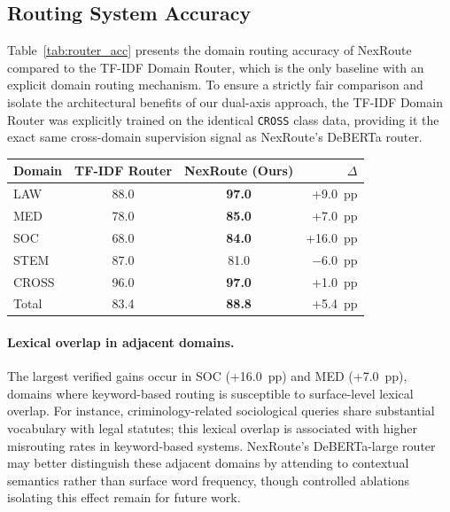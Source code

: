 \documentclass[a4paper,fleql,doubleblind]{cas-sc}
\begin{document}
\subsection{Routing System Accuracy}
\label{ssec:router}
Table~\ref{tab:router_acc} presents the domain routing accuracy of NexRoute
compared to the TF-IDF Domain Router, which is the only baseline with an explicit domain routing mechanism.
To ensure a strictly fair comparison and isolate the architectural
benefits of our dual-axis approach, the TF-IDF Domain Router was explicitly
trained on the identical \texttt{CROSS} class data, providing it the exact
same cross-domain supervision signal as NexRoute's DeBERTa router.

\vspace{6pt plus 4pt minus 3pt}
\begin{center}
\begingroup
{}
\label{tab:router_acc}
\begin{tabular}{lccr}
\toprule
\textbf{Domain} & \textbf{TF-IDF Router} & \textbf{NexRoute (Ours)} & \textbf{$\Delta$} \\
\midrule
LAW              & 88.0 & \textbf{97.0}  & +9.0~pp \\
MED              & 78.0 & \textbf{85.0}  & +7.0~pp \\
SOC              & 68.0 & \textbf{84.0}  & +16.0~pp \\
STEM             & 87.0 & 81.0           & $-$6.0~pp \\
\midrule
CROSS            & 96.0 & \textbf{97.0}  & +1.0~pp \\
\midrule
Total            & 83.4 & \textbf{88.8}  & +5.4~pp \\
\bottomrule
\end{tabular}
\endgroup
\end{center}
\vspace{6pt plus 4pt minus 3pt}

\paragraph{Lexical overlap in adjacent domains.}
The largest verified gains occur in SOC (+16.0~pp) and MED (+7.0~pp), domains
where keyword-based routing is susceptible to surface-level lexical overlap.
For instance, criminology-related sociological queries share substantial
vocabulary with legal statutes; this lexical overlap is associated with higher
misrouting rates in keyword-based systems.
NexRoute's DeBERTa-large router may better distinguish these adjacent domains
by attending to contextual semantics rather than surface word frequency,
though controlled ablations isolating this effect remain for future work.
\end{document}
